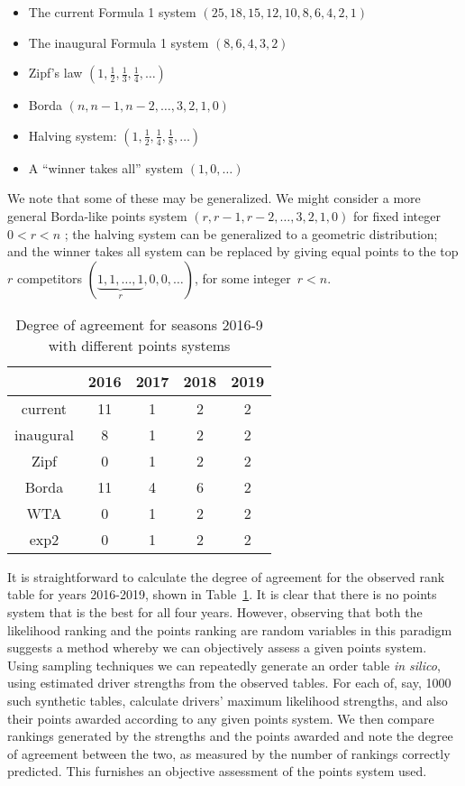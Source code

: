\documentclass[a4,12pt]{article}
\begin{document}
\begin{itemize}
\item The current Formula 1 system $(25,18,15,12,10,8,6,4,2,1)$
\item The inaugural Formula 1 system $(8,6,4,3,2)$
\item Zipf's law $(1,\frac{1}{2},\frac{1}{3},\frac{1}{4},\ldots)$
\item Borda $(n,n-1,n-2,\ldots,3,2,1,0)$
\item Halving system:  $(1,\frac{1}{2},\frac{1}{4},\frac{1}{8},\ldots)$
\item A ``winner takes all'' system $(1,0,\ldots)$
\end{itemize}

We note that some of these may be generalized.  We might consider a
more general Borda-like points system $(r,r-1,r-2,\ldots,3,2,1,0)$ for
fixed integer $0<r<n$ \citep{emerson2007}; the halving system can be
generalized to a geometric distribution; and the winner takes all
system can be replaced by giving equal points to the top \(r\)
competitors $(\underbrace{1,1,\ldots ,1}_{r},0,0,\ldots)$, for some
integer~$r<n$.

\begin{table}
\centering
\begin{tabular}{ |c|c|c|c|c|}
 \hline
         &    2016 & 2017 & 2018 & 2019\\ \hline
current  &    11   & 1    & 2    & 2   \\
inaugural&     8   & 1    & 2    & 2   \\
Zipf     &     0   & 1    & 2    & 2   \\
Borda    &    11   & 4    & 6    & 2   \\
WTA      &     0   & 1    & 2    & 2   \\
exp2     &     0   & 1    & 2    & 2   \\
 \hline
\end{tabular}
\caption{\doublespacing Degree of agreement for seasons 2016-9 with
  different \label{doapoints} points systems}
\end{table}


It is straightforward to calculate the degree of agreement for the
observed rank table for years 2016-2019, shown in
Table~\ref{doapoints}.  It is clear that there is no points system
that is the best for all four years.  However, observing that both the
likelihood ranking and the points ranking are random variables in this
paradigm suggests a method whereby we can objectively assess a given
points system.  Using sampling techniques we can repeatedly generate
an order table \emph{in silico}, using estimated driver strengths from
the observed tables.  For each of, say, 1000 such synthetic tables,
calculate drivers' maximum likelihood \citeauthor{plackett1975}
strengths, and also their points awarded according to any given points
system.  We then compare rankings generated by the
\citeauthor{plackett1975} strengths and the points awarded and note
the degree of agreement between the two, as measured by the number of
rankings correctly predicted.  This furnishes an objective assessment
of the points system used.
\end{document}
